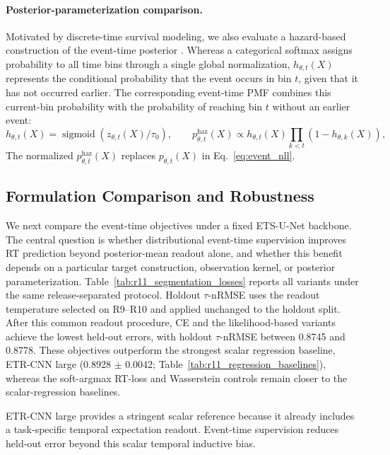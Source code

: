 \documentclass[12pt]{article}
\begin{document}
\paragraph{Posterior-parameterization comparison.}
Motivated by discrete-time survival modeling, we also evaluate a hazard-based
construction of the event-time posterior \citep{Gensheimer2019NnetSurvival}.
Whereas a categorical softmax assigns probability to all time bins through a
single global normalization, $h_{\theta,t}(X)$ represents the conditional
probability that the event occurs in bin $t$, given that it has not occurred
earlier. The corresponding event-time PMF combines this current-bin probability
with the probability of reaching bin $t$ without an earlier event:
\begin{equation}
\label{eq:hazard_readout}
h_{\theta,t}(X)
=\operatorname{sigmoid}\!\left(z_{\theta,t}(X)/\tau_0\right),\qquad
p_{\theta,t}^{\mathrm{haz}}(X)
\propto h_{\theta,t}(X)\prod_{k<t}\left(1-h_{\theta,k}(X)\right),
\end{equation}
The normalized $p_{\theta,t}^{\mathrm{haz}}(X)$ replaces $p_{\theta,t}(X)$ in
Eq.~\ref{eq:event_nll}.

\subsection{Formulation Comparison and Robustness}

We next compare the event-time objectives under a fixed ETS-U-Net backbone. The central question is whether distributional event-time supervision improves RT prediction beyond posterior-mean readout alone, and whether this benefit depends on a particular target construction, observation kernel, or posterior parameterization. Table~\ref{tab:r11_segmentation_losses} reports all variants under the same release-separated protocol. Holdout \(\tau\)-nRMSE uses the readout temperature selected on R9--R10 and applied unchanged to the holdout split. After this common readout procedure, CE and the likelihood-based variants achieve the lowest held-out errors, with holdout \(\tau\)-nRMSE between 0.8745 and 0.8778. These objectives outperform the strongest scalar regression baseline, ETR-CNN large (0.8928 $\pm$ 0.0042; Table~\ref{tab:r11_regression_baselines}), whereas the soft-argmax RT-loss and Wasserstein controls remain closer to the scalar-regression baselines.

ETR-CNN large provides a stringent scalar reference because it already includes a task-specific temporal expectation readout. Event-time supervision reduces held-out error beyond this scalar temporal inductive bias.
\end{document}
